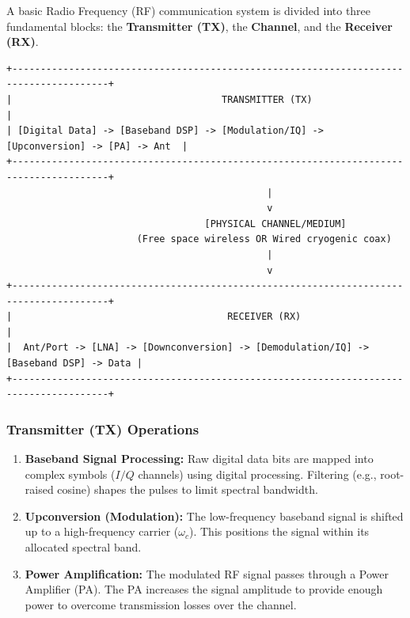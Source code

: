 \documentclass[
]{article}
\providecommand{\tightlist}{%
  \setlength{\itemsep}{0pt}\setlength{\parskip}{0pt}}
\begin{document}
A basic Radio Frequency (RF) communication system is divided into three
fundamental blocks: the \textbf{Transmitter (TX)}, the \textbf{Channel},
and the \textbf{Receiver (RX)}.

\begin{verbatim}
+---------------------------------------------------------------------------------------+
|                                     TRANSMITTER (TX)                                  |
| [Digital Data] -> [Baseband DSP] -> [Modulation/IQ] -> [Upconversion] -> [PA] -> Ant  |
+---------------------------------------------------------------------------------------+
                                              |
                                              v
                                   [PHYSICAL CHANNEL/MEDIUM] 
                       (Free space wireless OR Wired cryogenic coax)
                                              |
                                              v
+---------------------------------------------------------------------------------------+
|                                      RECEIVER (RX)                                    |
|  Ant/Port -> [LNA] -> [Downconversion] -> [Demodulation/IQ] -> [Baseband DSP] -> Data |
+---------------------------------------------------------------------------------------+
\end{verbatim}

\subsubsection{Transmitter (TX)
Operations}\label{transmitter-tx-operations}

\begin{enumerate}
\def\labelenumi{\arabic{enumi}.}
\tightlist
\item
  \textbf{Baseband Signal Processing:} Raw digital data bits are mapped
  into complex symbols (\(I/Q\) channels) using digital processing.
  Filtering (e.g., root-raised cosine) shapes the pulses to limit
  spectral bandwidth.
\item
  \textbf{Upconversion (Modulation):} The low-frequency baseband signal
  is shifted up to a high-frequency carrier (\(\omega_c\)). This
  positions the signal within its allocated spectral band.
\item
  \textbf{Power Amplification:} The modulated RF signal passes through a
  Power Amplifier (PA). The PA increases the signal amplitude to provide
  enough power to overcome transmission losses over the channel.
\end{enumerate}
\end{document}

